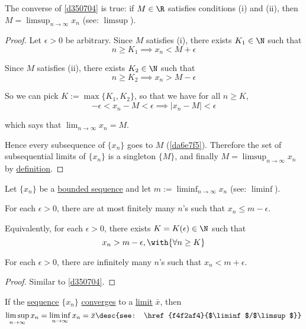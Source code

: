 \Theorem{}\label{b4ab746}

The converse of \autoref{d350704} is true: if $M\in\R$ satisfies conditions (i)
and (ii), then $M=\displaystyle\limsup_{n\to\infty}x_n$ (see:
\href{f4f2af4}{$\limsup$}).

\begin{proof}
  Let $\epsilon>0$ be arbitrary. Since $M$ satisfies (i), there exists
  $K_1\in\N$ such that
  $$
    n\geq K_1\implies x_n<M+\epsilon
  $$

  Since $M$ satisfies (ii), there exists $K_2\in\N$ such that
  $$
    n\geq K_2\implies x_n>M-\epsilon
  $$

  So we can pick $K:=\max\{K_1,K_2\}$, so that we have for all $n\geq K$,
  $$
    -\epsilon<x_n-M<\epsilon\implies|x_n-M|<\epsilon
  $$

  which says that $\displaystyle\lim_{n\to\infty}x_n=M$.

  Hence every subsequence of $\{x_n\}$ goes to $M$ (\autoref{da6e7f5}).
  Therefore the set of subsequential limits of $\{x_n\}$ is a singleton
  $\{M\}$, and finally $M=\displaystyle\limsup_{n\to\infty}x_n$ by
  \href{f4f2af4}{definition}.
\end{proof}

\Theorem{}\label{ea49e1a}

Let $\{x_n\}$ be a \href{d5ed299}{bounded sequence} and let
$m:=\displaystyle\liminf_{n\to\infty}x_n$ (see: \href{f4f2af4}{$\liminf$}).

\begin{enumerati}
  \item For each $\epsilon>0$, there are at most finitely many $n$'s such that
        $x_n\leq m-\epsilon$.

  Equivalently, for each $\epsilon>0$, there exists $K=K(\epsilon)\in\N$ such
  that
  $$
    x_n>m-\epsilon,\with{\forall n\geq K}
  $$

  \item For each $\epsilon>0$, there are infinitely many $n$'s such that
        $x_n<m+\epsilon$.
\end{enumerati}

\begin{proof}
  Similar to \autoref{d350704}.
\end{proof}

\label{ea8320c}

If the \href{b5fa0e4}{sequence} $\{x_n\}$ \href{de3e28a}{converges} to a
\href{e565120}{limit} $\bar x$, then
$$
  \limsup_{n\to\infty}x_n=\liminf_{n\to\infty}x_n=\bar x\desc{see: \href{f4f2af4}{$\liminf$/$\limsup$}}
$$

